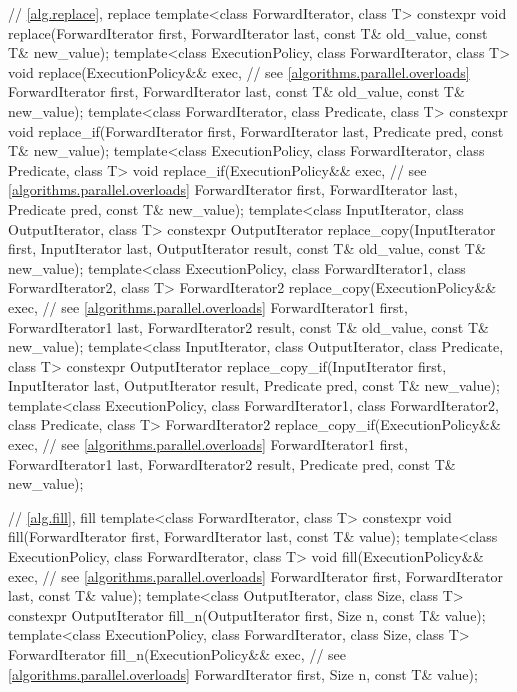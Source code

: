 \begin{codeblock}
{  // \ref{alg.replace}, replace
  template<class ForwardIterator, class T>
    constexpr void replace(ForwardIterator first, ForwardIterator last,
                           const T& old_value, const T& new_value);
  template<class ExecutionPolicy, class ForwardIterator, class T>
    void replace(ExecutionPolicy&& exec, // see \ref{algorithms.parallel.overloads}
                 ForwardIterator first, ForwardIterator last,
                 const T& old_value, const T& new_value);
  template<class ForwardIterator, class Predicate, class T>
    constexpr void replace_if(ForwardIterator first, ForwardIterator last,
                              Predicate pred, const T& new_value);
  template<class ExecutionPolicy, class ForwardIterator, class Predicate, class T>
    void replace_if(ExecutionPolicy&& exec, // see \ref{algorithms.parallel.overloads}
                    ForwardIterator first, ForwardIterator last,
                    Predicate pred, const T& new_value);
  template<class InputIterator, class OutputIterator, class T>
    constexpr OutputIterator replace_copy(InputIterator first, InputIterator last,
                                          OutputIterator result,
                                          const T& old_value, const T& new_value);
  template<class ExecutionPolicy, class ForwardIterator1, class ForwardIterator2, class T>
    ForwardIterator2 replace_copy(ExecutionPolicy&& exec, // see \ref{algorithms.parallel.overloads}
                                  ForwardIterator1 first, ForwardIterator1 last,
                                  ForwardIterator2 result,
                                  const T& old_value, const T& new_value);
  template<class InputIterator, class OutputIterator, class Predicate, class T>
    constexpr OutputIterator replace_copy_if(InputIterator first, InputIterator last,
                                             OutputIterator result,
                                             Predicate pred, const T& new_value);
  template<class ExecutionPolicy, class ForwardIterator1, class ForwardIterator2,
           class Predicate, class T>
    ForwardIterator2 replace_copy_if(ExecutionPolicy&& exec, // see \ref{algorithms.parallel.overloads}
                                     ForwardIterator1 first, ForwardIterator1 last,
                                     ForwardIterator2 result,
                                     Predicate pred, const T& new_value);

  // \ref{alg.fill}, fill
  template<class ForwardIterator, class T>
    constexpr void fill(ForwardIterator first, ForwardIterator last, const T& value);
  template<class ExecutionPolicy, class ForwardIterator, class T>
    void fill(ExecutionPolicy&& exec, // see \ref{algorithms.parallel.overloads}
              ForwardIterator first, ForwardIterator last, const T& value);
  template<class OutputIterator, class Size, class T>
    constexpr OutputIterator fill_n(OutputIterator first, Size n, const T& value);
  template<class ExecutionPolicy, class ForwardIterator,
           class Size, class T>
    ForwardIterator fill_n(ExecutionPolicy&& exec, // see \ref{algorithms.parallel.overloads}
                           ForwardIterator first, Size n, const T& value);

}
\end{codeblock}
